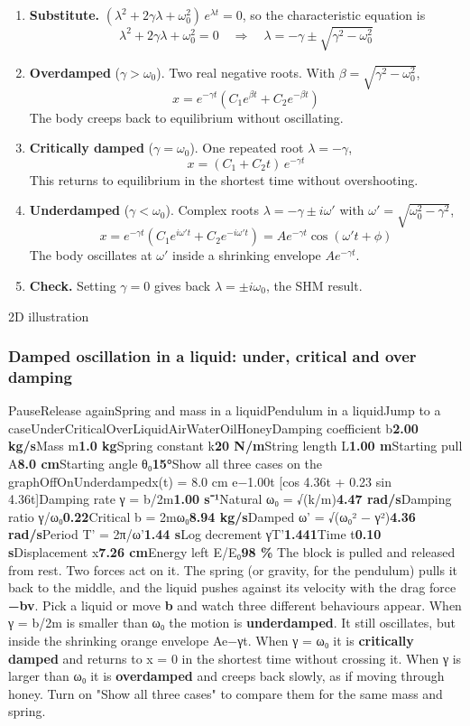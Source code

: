  
\begin{enumerate}
\item \textbf{Substitute.} $(\lambda^2+2\gamma\lambda+\omega_0^2)\,e^{\lambda t}=0$, so the characteristic equation is 
$$\lambda^2+2\gamma\lambda+\omega_0^2=0\quad\Rightarrow\quad\lambda=-\gamma\pm\sqrt{\gamma^2-\omega_0^2}$$
\item \textbf{Overdamped} ($\gamma>\omega_0$). Two real negative roots. With $\beta=\sqrt{\gamma^2-\omega_0^2}$, 
$$x=e^{-\gamma t}\left(C_1e^{\beta t}+C_2e^{-\beta t}\right)$$
 The body creeps back to equilibrium without oscillating.
\item \textbf{Critically damped} ($\gamma=\omega_0$). One repeated root $\lambda=-\gamma$, 
$$x=(C_1+C_2t)\,e^{-\gamma t}$$
 This returns to equilibrium in the shortest time without overshooting.
\item \textbf{Underdamped} ($\gamma<\omega_0$). Complex roots $\lambda=-\gamma\pm i\omega'$ with $\omega'=\sqrt{\omega_0^2-\gamma^2}$, 
$$x=e^{-\gamma t}\left(C_1e^{i\omega't}+C_2e^{-i\omega't}\right)=Ae^{-\gamma t}\cos(\omega't+\phi)$$
 The body oscillates at $\omega'$ inside a shrinking envelope $Ae^{-\gamma t}$.
\item \textbf{Check.} Setting $\gamma=0$ gives back $\lambda=\pm i\omega_0$, the SHM result.
\end{enumerate}

 2D illustration
\subsubsection{Damped oscillation in a liquid: under, critical and over damping}

PauseRelease againSpring and mass in a liquidPendulum in a liquidJump to a caseUnderCriticalOverLiquidAirWaterOilHoneyDamping coefficient b\textbf{2.00 kg/s}Mass m\textbf{1.0 kg}Spring constant k\textbf{20 N/m}String length L\textbf{1.00 m}Starting pull A\textbf{8.0 cm}Starting angle θ₀\textbf{15°}Show all three cases on the graphOffOnUnderdampedx(t) = 8.0 cm e−1.00t [cos 4.36t + 0.23 sin 4.36t]Damping rate γ = b/2m\textbf{1.00 s⁻¹}Natural ω₀ = √(k/m)\textbf{4.47 rad/s}Damping ratio γ/ω₀\textbf{0.22}Critical b = 2mω₀\textbf{8.94 kg/s}Damped ω' = √(ω₀² − γ²)\textbf{4.36 rad/s}Period T' = 2π/ω'\textbf{1.44 s}Log decrement γT'\textbf{1.441}Time t\textbf{0.10 s}Displacement x\textbf{7.26 cm}Energy left E/E₀\textbf{98 \%}
The block is pulled and released from rest. Two forces act on it. The spring (or gravity, for the pendulum) pulls it back to the middle, and the liquid pushes against its velocity with the drag force \textbf{−bv}. Pick a liquid or move \textbf{b} and watch three different behaviours appear. When γ = b/2m is smaller than ω₀ the motion is \textbf{underdamped}. It still oscillates, but inside the shrinking orange envelope Ae−γt. When γ = ω₀ it is \textbf{critically damped} and returns to x = 0 in the shortest time without crossing it. When γ is larger than ω₀ it is \textbf{overdamped} and creeps back slowly, as if moving through honey. Turn on "Show all three cases" to compare them for the same mass and spring.

